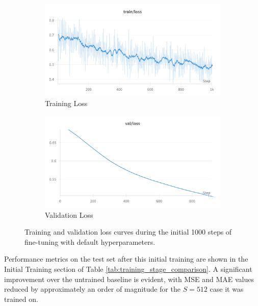 \documentclass{article}
\begin{document}
\begin{figure}[!htbp] 
    \centering 
    \begin{subfigure}[b]{0.48\linewidth} 
        \centering
        \includegraphics[width=\linewidth]{M2 Course Work//Images/initial_train_loss.png}
        \caption{Training Loss} %
        \label{fig:initial_train_loss} %
    \end{subfigure}
    \hfill 
    \begin{subfigure}[b]{0.48\linewidth}
        \centering
        \includegraphics[width=\linewidth]{M2 Course Work//Images/initial_validation_loss.png}
        \caption{Validation Loss} %
        \label{fig:initial_valid_loss} %
    \end{subfigure}
    \caption{Training and validation loss curves during the initial 1000 steps of fine-tuning with default hyperparameters.}
    \label{fig:initial_loss_curves} %
\end{figure}

Performance metrics on the test set after this initial training are shown in the Initial Training section of Table \ref{tab:training_stage_comparison}. A significant improvement over the untrained baseline is evident, with MSE and MAE values reduced by approximately an order of magnitude for the $S=512$ case it was trained on.
\end{document}
